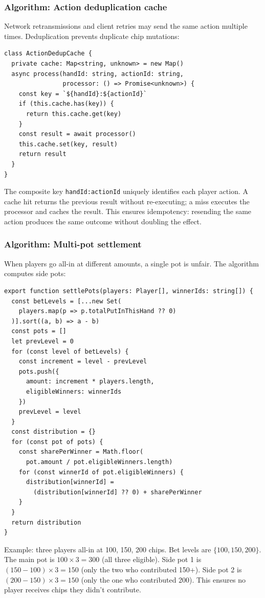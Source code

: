 \documentclass[11pt,a4paper]{article}
\begin{document}
\subsubsection{Algorithm: Action deduplication cache}

Network retransmissions and client retries may send the same action multiple times. Deduplication prevents duplicate chip mutations:

\begin{verbatim}
class ActionDedupCache {
  private cache: Map<string, unknown> = new Map()
  async process(handId: string, actionId: string,
                processor: () => Promise<unknown>) {
    const key = `${handId}:${actionId}`
    if (this.cache.has(key)) {
      return this.cache.get(key)
    }
    const result = await processor()
    this.cache.set(key, result)
    return result
  }
}
\end{verbatim}

\noindent The composite key \texttt{handId:actionId} uniquely identifies each player action. A cache hit returns the previous result without re-executing; a miss executes the processor and caches the result. This ensures idempotency: resending the same action produces the same outcome without doubling the effect.

\subsubsection{Algorithm: Multi-pot settlement}

When players go all-in at different amounts, a single pot is unfair. The algorithm computes side pots:

\begin{verbatim}
export function settlePots(players: Player[], winnerIds: string[]) {
  const betLevels = [...new Set(
    players.map(p => p.totalPutInThisHand ?? 0)
  )].sort((a, b) => a - b)
  const pots = []
  let prevLevel = 0
  for (const level of betLevels) {
    const increment = level - prevLevel
    pots.push({
      amount: increment * players.length,
      eligibleWinners: winnerIds
    })
    prevLevel = level
  }
  const distribution = {}
  for (const pot of pots) {
    const sharePerWinner = Math.floor(
      pot.amount / pot.eligibleWinners.length)
    for (const winnerId of pot.eligibleWinners) {
      distribution[winnerId] =
        (distribution[winnerId] ?? 0) + sharePerWinner
    }
  }
  return distribution
}
\end{verbatim}

\noindent Example: three players all-in at 100, 150, 200 chips. Bet levels are $\{100, 150, 200\}$. The main pot is $100 \times 3 = 300$ (all three eligible). Side pot 1 is $(150-100) \times 3 = 150$ (only the two who contributed 150+). Side pot 2 is $(200-150) \times 3 = 150$ (only the one who contributed 200). This ensures no player receives chips they didn't contribute.
\end{document}
